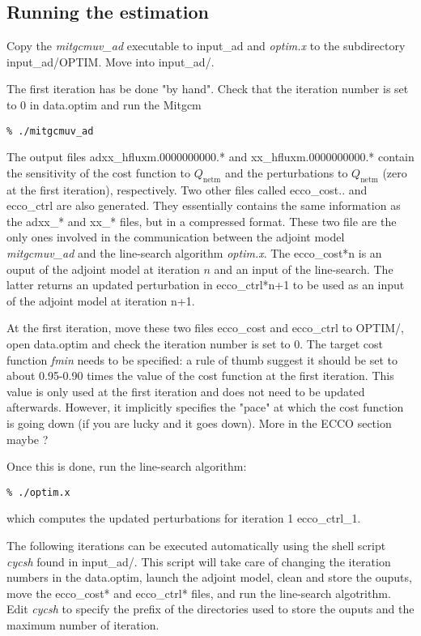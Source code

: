 \subsection{Running the estimation}

Copy the {\it mitgcmuv\_ad} executable to input\_ad and {\it optim.x}
to the subdirectory input\_ad/OPTIM. Move into input\_ad/.

The first iteration has be done "by hand". Check that the iteration number is set
to 0 in data.optim and run the Mitgcm
\begin{verbatim}
% ./mitgcmuv_ad
\end{verbatim}

The output files adxx\_hfluxm.0000000000.* and xx\_hfluxm.0000000000.* contain
the sensitivity of the cost function to $Q_\mathrm{netm}$ and the perturbations
to $Q_\mathrm{netm}$ (zero at the first iteration), respectively. Two other files
called ecco\_cost.. and ecco\_ctrl are also generated. They essentially contains
the same information as the adxx\_* and xx\_* files, but in a compressed format.
These two file are the only ones involved in the communication between the adjoint
model {\it mitgcmuv\_ad} and the line-search algorithm {\it optim.x}. The ecco\_cost*n
is an ouput of the adjoint model at iteration $n$ and an input of the line-search. The
latter returns an updated perturbation in ecco\_ctrl*n+1 to be used as an input of
the adjoint model at iteration n+1. 

At the first iteration, move these two files ecco\_cost and ecco\_ctrl 
to OPTIM/, open data.optim and check the iteration number is set to 0.
The target cost function {\it fmin} needs to be specified: a rule of thumb 
suggest it should be set to about 0.95-0.90 times the value of the cost
function at the first iteration. This value is only used at the first
iteration and does not need to be updated afterwards. 
However, it implicitly specifies the "pace" at which the cost function is
going down (if you are lucky and it goes down). More in the ECCO section maybe ?

Once this is done, run the line-search algorithm:
\begin{verbatim}
% ./optim.x
\end{verbatim}
which computes the updated perturbations for iteration 1 ecco\_ctrl\_1.

The following iterations can be executed automatically using the shell
script {\it cycsh}
found in input\_ad/. This script will take care of changing the iteration numbers in the
data.optim, launch the adjoint model, clean and store the ouputs, move the
ecco\_cost* and ecco\_ctrl* files, and run the line-search algotrithm.
Edit {\it cycsh} to specify the prefix of the directories used to store the ouputs and
the maximum number of iteration.

